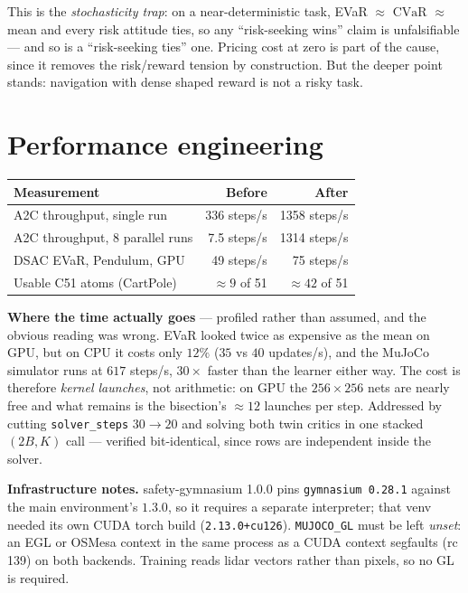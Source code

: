 \documentclass[11pt,a4paper]{article}
\newcommand{\cvar}{\mathrm{CVaR}}
\begin{document}
This is the \emph{stochasticity trap}: on a near-deterministic task, EVaR $\approx$
$\cvar$ $\approx$ mean and every risk attitude ties, so any ``risk-seeking wins''
claim is unfalsifiable --- and so is a ``risk-seeking ties'' one. Pricing cost at
zero is part of the cause, since it removes the risk/reward tension by
construction. But the deeper point stands: navigation with dense shaped reward is
not a risky task.

\section{Performance engineering}

\begin{center}
\small
\begin{tabular}{@{}lrr@{}}
\toprule
\textbf{Measurement} & \textbf{Before} & \textbf{After} \\
\midrule
A2C throughput, single run & 336 steps/s & 1358 steps/s \\
A2C throughput, 8 parallel runs & 7.5 steps/s & 1314 steps/s \\
DSAC EVaR, Pendulum, GPU & 49 steps/s & 75 steps/s \\
Usable C51 atoms (CartPole) & $\approx 9$ of 51 & $\approx 42$ of 51 \\
\bottomrule
\end{tabular}
\end{center}

\noindent\textbf{Where the time actually goes} --- profiled rather than assumed, and
the obvious reading was wrong. EVaR looked twice as expensive as the mean on GPU,
but on CPU it costs only $12\%$ ($35$ vs $40$ updates/s), and the MuJoCo simulator
runs at $617$ steps/s, $30\times$ faster than the learner either way. The cost is
therefore \emph{kernel launches}, not arithmetic: on GPU the $256\times256$ nets
are nearly free and what remains is the bisection's $\approx 12$ launches per step.
Addressed by cutting \texttt{solver\_steps} $30 \to 20$ and solving both twin
critics in one stacked $(2B, K)$ call --- verified bit-identical, since rows are
independent inside the solver.

\noindent\textbf{Infrastructure notes.} safety-gymnasium 1.0.0 pins
\texttt{gymnasium 0.28.1} against the main environment's $1.3.0$, so it requires a
separate interpreter; that venv needed its own CUDA torch build
(\texttt{2.13.0+cu126}). \texttt{MUJOCO\_GL} must be left \emph{unset}: an EGL or
OSMesa context in the same process as a CUDA context segfaults (rc 139) on both
backends. Training reads lidar vectors rather than pixels, so no GL is required.
\end{document}
